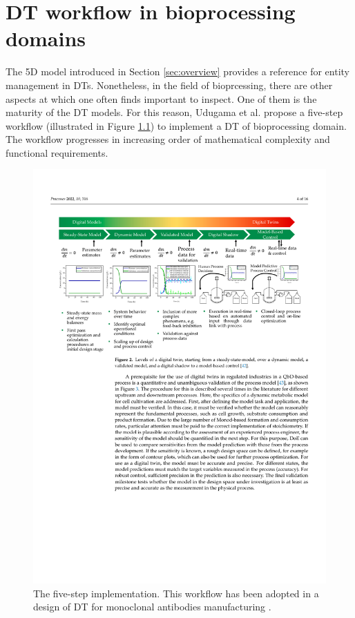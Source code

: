 \chapter{DT workflow in bioprocessing domains} \label{apd:workflow}
The 5D model introduced in Section \ref{sec:overview} provides a reference for entity management in DTs. Nonetheless, in the field of bioprcessing, there are other aspects at which one often finds important to inspect. One of them is the maturity of the DT models. For this reason, Udugama et al. \cite{Udugama2021} propose a five-step workflow (illustrated in Figure \ref{fig:fivestep}) to implement a DT of bioprocessing domain. The workflow progresses in increasing order of mathematical complexity and functional requirements.

\begin{figure}[hbt!]
  \centering
  \includegraphics[scale=0.8]{figures/fivestep.pdf}
  \caption[The five-step implementation]{The five-step implementation. This workflow has been adopted in a design of DT for monoclonal antibodies manufacturing \cite{Helgers2022}.}
  \label{fig:fivestep}
\end{figure}

